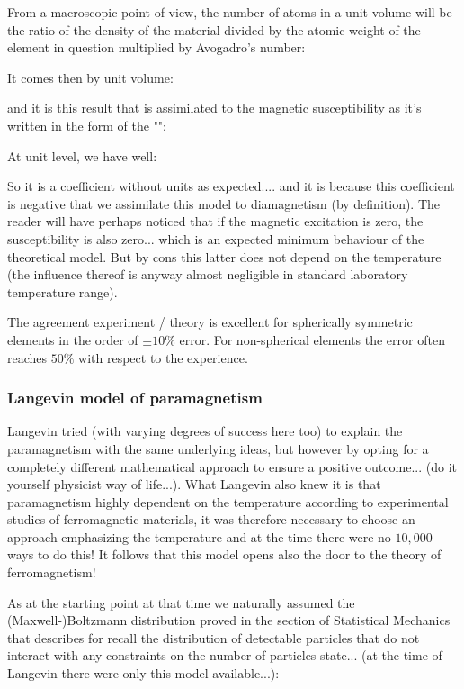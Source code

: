 	From a macroscopic point of view, the number of atoms in a unit volume will be the ratio of the density of the material divided by the atomic weight of the element in question multiplied by Avogadro's number:
	
	It comes then by unit volume:
	
	and it is this result that is assimilated to the magnetic susceptibility as it's written in the form of the "":
	
	At unit level, we have well:
	
	So it is a coefficient without units as expected.... and it is because this coefficient is negative that we assimilate this model to diamagnetism (by definition). The reader will have perhaps noticed that if the magnetic excitation is zero, the susceptibility is also zero... which is an expected minimum behaviour of the theoretical model. But by cons this latter does not depend on the temperature (the influence thereof is anyway almost negligible in standard laboratory temperature range).

	The agreement experiment / theory is excellent for spherically symmetric elements in the order of $\pm 10\%$ error. For non-spherical elements the error often reaches $50\%$ with respect to the experience.
	
	\pagebreak
	\subsubsection{Langevin model of paramagnetism}
	Langevin tried (with varying degrees of success here too) to explain the paramagnetism with the same underlying ideas, but however by opting for a completely different mathematical approach to ensure a positive outcome... (do it yourself physicist way of life...). What Langevin also knew it is that paramagnetism highly dependent on the temperature according to experimental studies of ferromagnetic materials, it was therefore necessary to choose an approach emphasizing the temperature and at the time there were no $10,000$ ways to do this! It follows that this model opens also the door to the theory of ferromagnetism!

	As at the starting point at that time we naturally assumed the (Maxwell-)Boltzmann distribution proved in the section of Statistical Mechanics that describes for recall the distribution of detectable particles that do not interact with any constraints on the number of particles state... (at the time of Langevin there were only this model available...):
	
